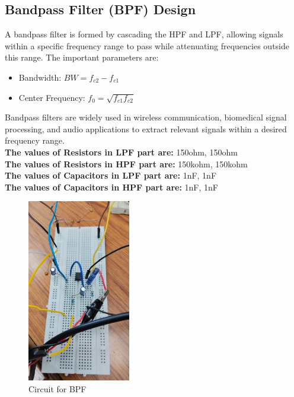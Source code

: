 \documentclass[a4paper,12pt]{article}
\begin{document}
\subsection{Bandpass Filter (BPF) Design}
A bandpass filter is formed by cascading the HPF and LPF, allowing signals within a specific frequency range to pass while attenuating frequencies outside this range. The important parameters are:
\begin{itemize}
    \item Bandwidth: $BW = f_{c2} - f_{c1}$
    \item Center Frequency: $f_0 = \sqrt{f_{c1} f_{c2}}$
\end{itemize}
Bandpass filters are widely used in wireless communication, biomedical signal processing, and audio applications to extract relevant signals within a desired frequency range.\\
\textbf{The values of Resistors in LPF part are:} 150ohm, 150ohm\\
\textbf{The values of Resistors in HPF part are:} 150kohm, 150kohm \\
\textbf{The values of Capacitors in LPF part are:} 1nF, 1nF \\
\textbf{The values of Capacitors in HPF part are:} 1nF, 1nF \\
\begin{figure}[H]
    \centering
    \includegraphics[width=0.4\textwidth]{figs/bpf_circuit.jpeg}
    \caption{Circuit for BPF}
\end{figure}
\end{document}
